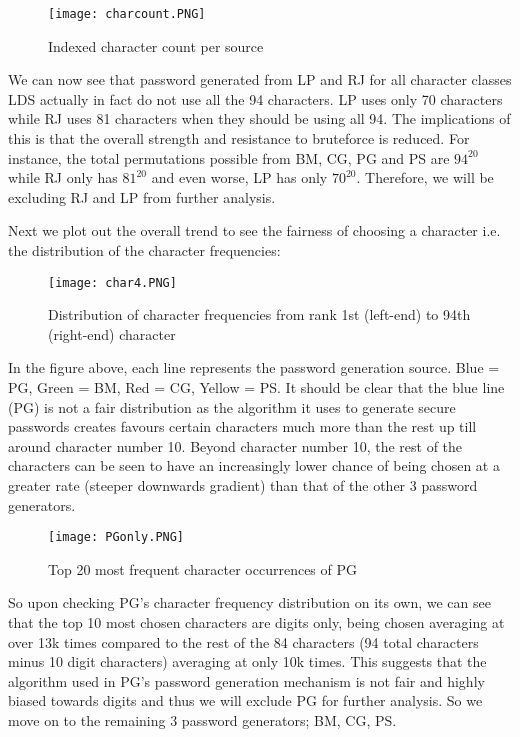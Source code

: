 \documentclass[letterpaper,twocolumn,10pt]{article}
\begin{document}
\begin{figure}[H]
    \centering
    \texttt{[image: charcount.PNG]}
    \caption{Indexed character count per source}
\end{figure}

We can now see that password generated from LP and RJ for all character classes LDS actually in fact do not use all the 94 characters. LP uses only 70 characters while RJ uses 81 characters when they should be using all 94. The implications of this is that the overall strength and resistance to bruteforce is reduced. For instance, the total permutations possible from BM, CG, PG and PS are \(94^{20}\) while RJ only has  \(81^{20}\) and even worse, LP has only \(70^{20}\). Therefore, we will be excluding RJ and LP from further analysis. 

Next we plot out the overall trend to see the fairness of choosing a character i.e. the distribution of the character frequencies:

\begin{figure}[H]
    \centering
    \texttt{[image: char4.PNG]}
    \caption{Distribution of character frequencies from rank 1st (left-end) to 94th (right-end) character}
\end{figure}

In the figure above, each line represents the password generation source. Blue = PG, Green = BM, Red = CG, Yellow = PS. It should be clear that the blue line (PG) is not a fair distribution as the algorithm it uses to generate secure passwords creates favours certain characters much more than the rest up till around character number 10. Beyond character number 10, the rest of the characters can be seen to have an increasingly lower chance of being chosen at a greater rate (steeper downwards gradient) than that of the other 3 password generators. 

\begin{figure}[H]
    \centering
    \texttt{[image: PGonly.PNG]}
    \caption{Top 20 most frequent character occurrences of PG}
\end{figure}

So upon checking PG's character frequency distribution on its own, we can see that the top 10 most chosen characters are digits only, being chosen averaging at over 13k times compared to the rest of the 84 characters (94 total characters minus 10 digit characters) averaging at only 10k times. This suggests that the algorithm used in PG's password generation mechanism is not fair and highly biased towards digits and thus we will exclude PG for further analysis. So we move on to the remaining 3 password generators; BM, CG, PS.
\end{document}
